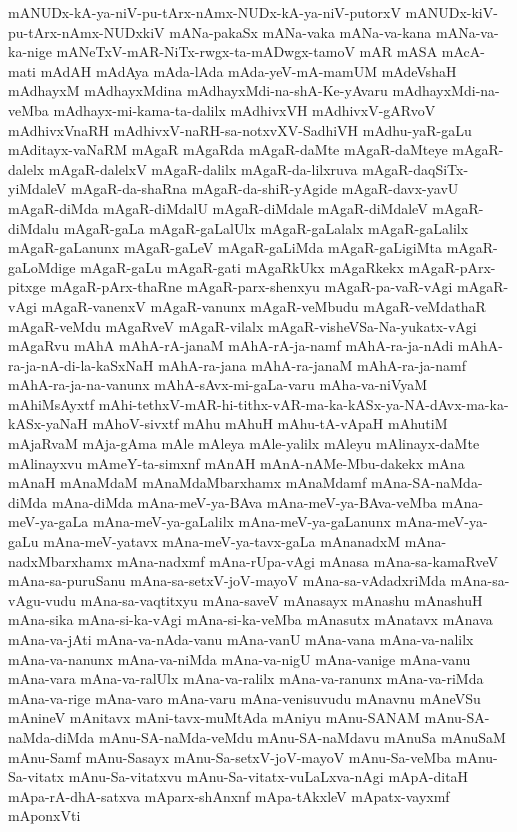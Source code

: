 {mANUDx-kA-ya-niV-pu-tArx-nAmx-NUDx-kA-ya-niV-putorxV
mANUDx-kiV-pu-tArx-nAmx-NUDxkiV
mANa-pakaSx
mANa-vaka
mANa-va-kana
mANa-va-ka-nige
mANeTxV-mAR-NiTx-rwgx-ta-mADwgx-tamoV
mAR
mASA
mAcA-mati
mAdAH
mAdAya
mAda-lAda
mAda-yeV-mA-mamUM
mAdeVshaH
mAdhayxM
mAdhayxMdina
mAdhayxMdi-na-shA-Ke-yAvaru
mAdhayxMdi-na-veMba
mAdhayx-mi-kama-ta-dalilx
mAdhivxVH
mAdhivxV-gARvoV
mAdhivxVnaRH
mAdhivxV-naRH-sa-notxvXV-SadhiVH
mAdhu-yaR-gaLu
mAditayx-vaNaRM
mAgaR
mAgaRda
mAgaR-daMte
mAgaR-daMteye
mAgaR-dalelx
mAgaR-dalelxV
mAgaR-dalilx
mAgaR-da-lilxruva
mAgaR-daqSiTx-yiMdaleV
mAgaR-da-shaRna
mAgaR-da-shiR-yAgide
mAgaR-davx-yavU
mAgaR-diMda
mAgaR-diMdalU
mAgaR-diMdale
mAgaR-diMdaleV
mAgaR-diMdalu
mAgaR-gaLa
mAgaR-gaLalUlx
mAgaR-gaLalalx
mAgaR-gaLalilx
mAgaR-gaLanunx
mAgaR-gaLeV
mAgaR-gaLiMda
mAgaR-gaLigiMta
mAgaR-gaLoMdige
mAgaR-gaLu
mAgaR-gati
mAgaRkUkx
mAgaRkekx
mAgaR-pArx-pitxge
mAgaR-pArx-thaRne
mAgaR-parx-shenxyu
mAgaR-pa-vaR-vAgi
mAgaR-vAgi
mAgaR-vanenxV
mAgaR-vanunx
mAgaR-veMbudu
mAgaR-veMdathaR
mAgaR-veMdu
mAgaRveV
mAgaR-vilalx
mAgaR-visheVSa-Na-yukatx-vAgi
mAgaRvu
mAhA
mAhA-rA-janaM
mAhA-rA-ja-namf
mAhA-ra-ja-nAdi
mAhA-ra-ja-nA-di-la-kaSxNaH
mAhA-ra-jana
mAhA-ra-janaM
mAhA-ra-ja-namf
mAhA-ra-ja-na-vanunx
mAhA-sAvx-mi-gaLa-varu
mAha-va-niVyaM
mAhiMsAyxtf
mAhi-tethxV-mAR-hi-tithx-vAR-ma-ka-kASx-ya-NA-dAvx-ma-ka-kASx-yaNaH
mAhoV-sivxtf
mAhu
mAhuH
mAhu-tA-vApaH
mAhutiM
mAjaRvaM
mAja-gAma
mAle
mAleya
mAle-yalilx
mAleyu
mAlinayx-daMte
mAlinayxvu
mAmeY-ta-simxnf
mAnAH
mAnA-nAMe-Mbu-dakekx
mAna
mAnaH
mAnaMdaM
mAnaMdaMbarxhamx
mAnaMdamf
mAna-SA-naMda-diMda
mAna-diMda
mAna-meV-ya-BAva
mAna-meV-ya-BAva-veMba
mAna-meV-ya-gaLa
mAna-meV-ya-gaLalilx
mAna-meV-ya-gaLanunx
mAna-meV-ya-gaLu
mAna-meV-yatavx
mAna-meV-ya-tavx-gaLa
mAnanadxM
mAna-nadxMbarxhamx
mAna-nadxmf
mAna-rUpa-vAgi
mAnasa
mAna-sa-kamaRveV
mAna-sa-puruSanu
mAna-sa-setxV-joV-mayoV
mAna-sa-vAdadxriMda
mAna-sa-vAgu-vudu
mAna-sa-vaqtitxyu
mAna-saveV
mAnasayx
mAnashu
mAnashuH
mAna-sika
mAna-si-ka-vAgi
mAna-si-ka-veMba
mAnasutx
mAnatavx
mAnava
mAna-va-jAti
mAna-va-nAda-vanu
mAna-vanU
mAna-vana
mAna-va-nalilx
mAna-va-nanunx
mAna-va-niMda
mAna-va-nigU
mAna-vanige
mAna-vanu
mAna-vara
mAna-va-ralUlx
mAna-va-ralilx
mAna-va-ranunx
mAna-va-riMda
mAna-va-rige
mAna-varo
mAna-varu
mAna-venisuvudu
mAnavnu
mAneVSu
mAnineV
mAnitavx
mAni-tavx-muMtAda
mAniyu
mAnu-SANAM
mAnu-SA-naMda-diMda
mAnu-SA-naMda-veMdu
mAnu-SA-naMdavu
mAnuSa
mAnuSaM
mAnu-Samf
mAnu-Sasayx
mAnu-Sa-setxV-joV-mayoV
mAnu-Sa-veMba
mAnu-Sa-vitatx
mAnu-Sa-vitatxvu
mAnu-Sa-vitatx-vuLaLxva-nAgi
mApA-ditaH
mApa-rA-dhA-satxva
mAparx-shAnxnf
mApa-tAkxleV
mApatx-vayxmf
mAponxVti
}
